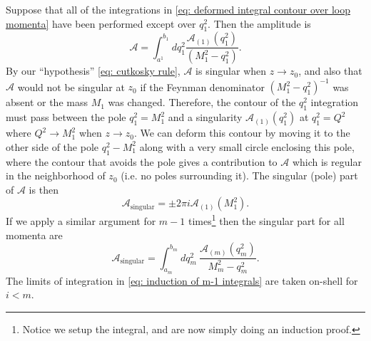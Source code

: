 \documentclass[a4paper,11pt]{article}
\begin{document}
Suppose that all of the integrations in \eqref{eq: deformed integral contour over loop momenta} have been performed except over $q_1^2$. Then the amplitude is
\begin{equation}
    \mathcal{A} = \int_{a^1}^{b_1}dq_1^2\frac{\mathcal{A}_{(1)}(q_1^2)}{(M_1^2 - q_1^2)}\label{eq: integrated over deformed feynman amplitude}.
\end{equation}
By our ``hypothesis'' \eqref{eq: cutkosky rule}, $\mathcal{A}$ is singular when $z\rightarrow z_0$, and also that $\mathcal{A}$ would not be singular at $z_0$ if the Feynman denominator $(M_1^2-q_1^2)^{-1}$ was absent or the mass $M_1$ was changed. Therefore, the contour of the $q_1^2$ integration must pass between the pole $q_1^2 = M_1^2$ and a singularity $\mathcal{A}_{(1)}(q_1^2)$ at $q_1^2 = Q^2$ where $Q^2\rightarrow M_1^2$ when $z\rightarrow z_0$. We can deform this contour by moving it to the other side of the pole $q_1^2-M_1^2$ along with a very small circle enclosing this pole, where the contour that avoids the pole gives a contribution to $\mathcal{A}$ which is regular in the neighborhood of $z_0$ (i.e. no poles surrounding it). The singular (pole) part of $\mathcal{A}$ is then
\begin{equation}
    \mathcal{A}_{\text{singular}} = \pm 2\pi i\mathcal{A}_{(1)}(M_1^2)\label{eq: proof by induction at n=1 step}.
\end{equation}
If we apply a similar argument for $m-1$ times\footnote{Notice we setup the integral, and are now simply doing an induction proof.} then the singular part for all momenta are
\begin{equation}
    \mathcal{A}_{\text{singular}} = \int_{a_m}^{b_m}dq_m^2\:\frac{\mathcal{A}_{(m)}(q_m^2)}{M_m^2 - q_m^2}\label{eq: induction of m-1 integrals}.
\end{equation}
The limits of integration in \eqref{eq: induction of m-1 integrals} are taken on-shell for $i<m$. 
\end{document}
